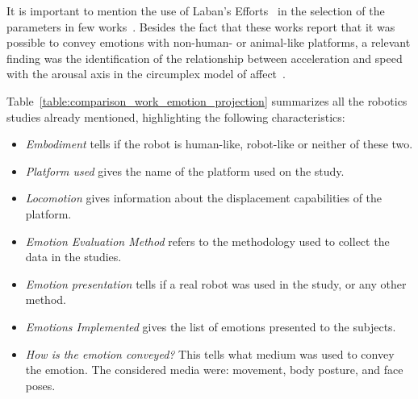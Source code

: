 It is important to mention the use of Laban's Efforts~\cite{Laban1968} in the selection of the parameters in few works~\cite{BarakovaL10, Sharma2013}. Besides the fact that these works report that it was possible to convey emotions with non-human- or animal-like platforms, a relevant finding was the identification of the relationship between acceleration and speed with the arousal axis in the circumplex model of affect~\cite{Petta2010}.

Table~\ref{table:comparison_work_emotion_projection} summarizes all the robotics studies already mentioned, highlighting the following characteristics:
\begin{itemize}

	\item \textit{Embodiment} tells if the robot is human-like, robot-like or neither of these two.

	\item \textit{Platform used} gives the name of the platform used on the study.

	\item \textit{Locomotion} gives information about the  displacement capabilities of the platform.

	\item \textit{Emotion Evaluation Method} refers to the methodology used to collect the data in the studies.

	\item \textit{Emotion presentation} tells if a real robot was used in the study, or any other method.

	\item \textit{Emotions Implemented} gives the list of emotions presented to the subjects.
	
	\item \textit{How is the emotion conveyed?} This tells what medium was used to convey the emotion. The considered media were: movement, body posture, and face poses.
	
\end{itemize}



